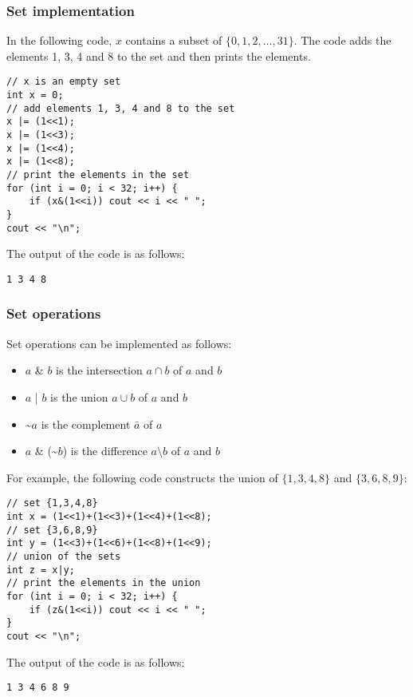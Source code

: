 \subsubsection{Set implementation}

In the following code, $x$
contains a subset of $\{0,1,2,\ldots,31\}$.
The code adds the elements 1, 3, 4 and 8
to the set and then prints the elements.

\begin{lstlisting}
// x is an empty set
int x = 0;
// add elements 1, 3, 4 and 8 to the set
x |= (1<<1);
x |= (1<<3);
x |= (1<<4);
x |= (1<<8);
// print the elements in the set
for (int i = 0; i < 32; i++) {
    if (x&(1<<i)) cout << i << " ";
}
cout << "\n";
\end{lstlisting}

The output of the code is as follows:

\begin{lstlisting}
1 3 4 8
\end{lstlisting}

\subsubsection{Set operations}

Set operations can be implemented as follows:
\begin{itemize}
\item $a$ \& $b$ is the intersection $a \cap b$ of $a$ and $b$
\item $a$ | $b$ is the union $a \cup b$ of $a$ and $b$
\item \textasciitilde$a$ is the complement $\bar a$ of $a$
\item $a$ \& (\textasciitilde$b$) is the difference
$a \setminus b$ of $a$ and $b$
\end{itemize}

For example, the following code constructs the union
of $\{1,3,4,8\}$ and $\{3,6,8,9\}$:

\begin{lstlisting}
// set {1,3,4,8}
int x = (1<<1)+(1<<3)+(1<<4)+(1<<8);
// set {3,6,8,9}
int y = (1<<3)+(1<<6)+(1<<8)+(1<<9);
// union of the sets
int z = x|y;
// print the elements in the union
for (int i = 0; i < 32; i++) {
    if (z&(1<<i)) cout << i << " ";
}
cout << "\n";
\end{lstlisting}

The output of the code is as follows:

\begin{lstlisting}
1 3 4 6 8 9
\end{lstlisting}

